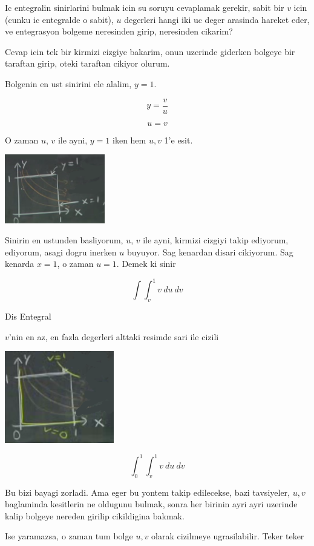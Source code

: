 \documentclass[12pt,fleqn]{article}
\begin{document}
Ic entegralin sinirlarini bulmak icin su soruyu cevaplamak gerekir, sabit
bir $v$ icin (cunku ic entegralde o sabit), $u$ degerleri hangi iki uc
deger arasinda hareket eder, ve entegrasyon bolgeme neresinden girip,
neresinden cikarim? 

Cevap icin tek bir kirmizi cizgiye bakarim, onun uzerinde giderken bolgeye
bir taraftan girip, oteki taraftan cikiyor olurum. 

Bolgenin en ust sinirini ele alalim, $y=1$. 

\[ y = \frac{v}{u}  \]

\[ u = v \]

O zaman $u$, $v$ ile ayni, $y=1$ iken hem $u,v$ 1'e esit.

\includegraphics[height=3cm]{18_7.png}

Sinirin en ustunden basliyorum, $u$, $v$ ile ayni, kirmizi cizgiyi takip
ediyorum, ediyorum, asagi dogru inerken $u$ buyuyor. Sag kenardan disari
cikiyorum. Sag kenarda $x=1$, o zaman $u = 1$. Demek ki sinir

\[ \int \int _v^1 v \ du \ dv \]

Dis Entegral 

$v$'nin en az, en fazla degerleri alttaki resimde sari ile cizili

\includegraphics[height=4cm]{18_8.png}

\[ \int_0^1 \int _v^1 v \ du \ dv \]

Bu bizi bayagi zorladi. Ama eger bu yontem takip edilecekse, bazi
tavsiyeler, $u,v$ baglaminda kesitlerin ne oldugunu bulmak, sonra her
birinin ayri ayri uzerinde kalip bolgeye nereden girilip cikildigina
bakmak. 

Ise yaramazsa, o zaman tum bolge $u,v$ olarak cizilmeye
ugrasilabilir. Teker teker 
\end{document}
